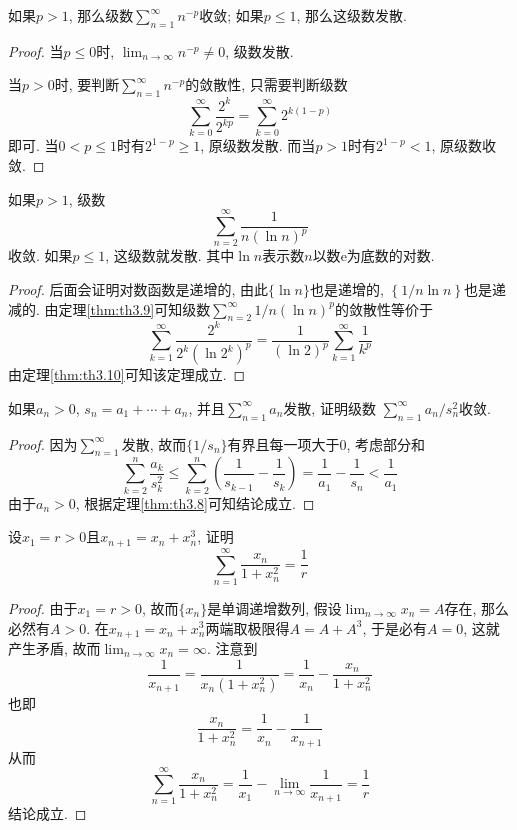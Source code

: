 \documentclass[cn,12pt,math=mtpro2,citestyle=gb7714-2015,bibstyle=gb7714-2015,twocol]{elegantbook}
\newcommand{\limn}{\lim_{n\to\infty}}
\begin{document}
\begin{theorem}\label{thm:th3.10}
  如果$p>1$, 那么级数$\sum_{n=1}^{\infty}n^{-p}$收敛; 如果$p\leq 1$, 那么这级数发散.
\end{theorem}
\begin{proof}
  当$p\leq 0$时, $\limn n^{-p}\neq0$, 级数发散.

  当$p>0$时, 要判断$\sum_{n=1}^{\infty}n^{-p}$的敛散性, 只需要判断级数
  $$\sum_{k=0}^{\infty}\frac{2^k}{2^{kp}}=\sum_{k=0}^{\infty}2^{k(1-p)}$$
  即可. 当$0<p\leq 1$时有$2^{1-p}\geq 1$, 原级数发散. 而当$p>1$时有$2^{1-p}<1$, 原级数收敛.
\end{proof}
\begin{theorem}
  如果$p>1$, 级数
  $$\sum_{n=2}^{\infty}\frac{1}{n(\ln n)^p}$$
  收敛. 如果$p\leq1$, 这级数就发散. 其中$\ln n$表示数$n$以数$\text{e}$为底数的对数.
\end{theorem}
\begin{proof}
  后面会证明对数函数是递增的, 由此$\{\ln n\}$也是递增的, $\left\{1/n\ln n\right\}$也是递减的. 由定理\ref{thm:th3.9}可知级数$\sum_ {n=2}^{\infty}1/{n(\ln n)^p}$的敛散性等价于
  $$\sum_{k=1}^{\infty}\frac{2^k}{2^k(\ln2^k)^p}=\frac{1}{(\ln2)^p}\sum_{k=1}^{\infty}\frac{1}{k^p}$$
  由定理\ref{thm:th3.10}可知该定理成立.

\end{proof}
\begin{example}
如果$a_n>0$, $s_n=a_1+\cdots+a_n$, 并且$\sum_{n=1}^{\infty}a_n$发散, 证明级数
$\sum_{n=1}^{\infty}a_n/s_n^2$收敛.
\end{example}
\begin{proof}
  因为$\sum_{n=1}^{\infty}$发散, 故而$\{1/s_n\}$有界且每一项大于0, 考虑部分和
  $$\sum_{k=2}^{n}\frac{a_k}{s_k^2}\leq \sum_{k=2}^{n}\left(\frac{1}{s_{k-1}}-\frac{1}{s_k}\right)=\frac{1}{a_1}-\frac{1}{s_n}<\frac{1}{a_1}$$
  由于$a_n>0$, 根据定理\ref{thm:th3.8}可知结论成立.
\end{proof}

\begin{example}
设$x_1=r>0$且$x_{n+1}=x_n+x_n^3$, 证明
$$\sum_{n=1}^{\infty}\frac{x_n}{1+x_n^2}=\frac{1}{r}$$
\end{example}
\begin{proof}
  由于$x_1=r>0$, 故而$\{x_n\}$是单调递增数列, 假设$\limn x_n=A$存在, 那么必然有$A>0$. 在$x_{n+1}=x_n+x_n^3$两端取极限得$A=A+A^3$, 于是必有$A=0$, 这就产生矛盾, 故而$\limn x_n=\infty$. 注意到
  $$\frac{1}{x_{n+1}}=\frac{1}{x_n(1+x_n^2)}=\frac{1}{x_n}-\frac{x_n}{1+x_n^2}$$
  也即
  $$\frac{x_n}{1+x_n^2}=\frac{1}{x_n}-\frac{1}{x_{n+1}}$$
  从而
  $$\sum_{n=1}^{\infty}\frac{x_n}{1+x_n^2}=\frac{1}{x_1}-\limn \frac{1}{x_{n+1}}=\frac{1}{r}$$
  结论成立.
\end{proof}
\newpage
\end{document}
